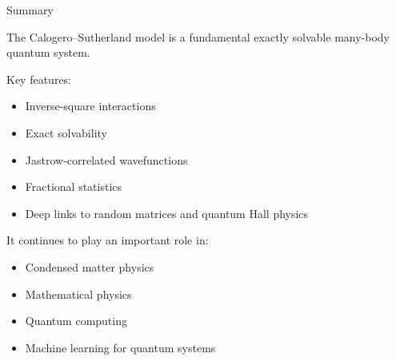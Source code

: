 \documentclass{beamer}
\begin{document}
\begin{frame}{Summary}

The Calogero--Sutherland model is a fundamental exactly solvable
many-body quantum system.

\vspace{0.4cm}

Key features:

\begin{itemize}
    \item Inverse-square interactions
    \item Exact solvability
    \item Jastrow-correlated wavefunctions
    \item Fractional statistics
    \item Deep links to random matrices and quantum Hall physics
\end{itemize}

\vspace{0.4cm}

It continues to play an important role in:
\begin{itemize}
    \item Condensed matter physics
    \item Mathematical physics
    \item Quantum computing
    \item Machine learning for quantum systems
\end{itemize}

\end{frame}

\end{document}
